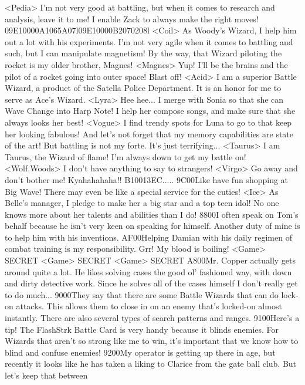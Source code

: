 <Pedia> I'm not very good at battling, but when it comes to research and analysis, 
leave it to me! I enable Zack to always make the right moves! 
{09}{E1}{00}{00}{A1}{06}{5A}{07}l{09}{E1}{00}{00}{B2}{07}{02}{08}l
<Coil> As Woody's Wizard, I help him out a lot with his experiments. 
I'm not very agile when it comes to battling and such, 
but I can manipulate magnetism! 
By the way, that Wizard piloting the rocket is my older brother, Magnes! 
<Magnes> Yup! I'll be the brains and the pilot of a rocket going into outer space! Blast off! 
<Acid> I am a superior Battle Wizard, a product of the Satella Police Department. 
It is an honor for me to serve as Ace's Wizard. 
<Lyra> Hee hee... I merge with Sonia so that she can Wave Change 
into Harp Note! I help her compose songs, 
and make sure that she always looks her best! 
<Vogue> I find trendy spots for Luna to go to that keep her looking fabulous! 
And let's not forget that my memory capabilities are state of the art! 
But battling is not my forte. It's just terrifying... 
<Taurus> I am Taurus, the Wizard of flame! 
I'm always down to get my battle on! 
<Wolf.Woods> I don't have anything to say to strangers! 
<Virgo> Go away and don't bother me! Kyahahahaha!! 
{B1}{00}{13}{EC}..... 
{9C}{00}Like have fun shopping at Big Wave! 
There may even be like a special service for the cuties! 
<Ice> As Belle's manager, I pledge to make her a big star and a top teen idol! 
No one knows more about her talents and abilities than I do! 
{88}{00}I often speak on Tom's behalf because he isn't very 
keen on speaking for himself. 
Another duty of mine is to help him with his inventions. 
{AF}{00}Helping Damian with his daily regimen of combat training is my responsibility. 
Grr! My blood is boiling! 
<Game> SECRET 
<Game> SECRET 
<Game> SECRET 
{A8}{00}Mr. Copper actually gets around quite a lot. 
He likes solving cases the good ol' fashioned way, 
with down and dirty detective work. 
Since he solves all of the cases himself I don't really get to do much... 
{90}{00}They say that there are some Battle Wizards that can do lock-on attacks. 
This allows them to close in on an enemy that's locked-on almost instantly. 
There are also several types of search patterns and ranges. 
{91}{00}Here's a tip! 
The FlashStrk Battle Card is very handy because it blinds enemies. 
For Wizards that aren't so strong like me to win, 
it's important that we know how to blind and confuse enemies! 
{92}{00}My operator is getting up there in age, but recently it looks like he has taken a 
liking to Clarice from the gate ball club. But let's keep that between 
